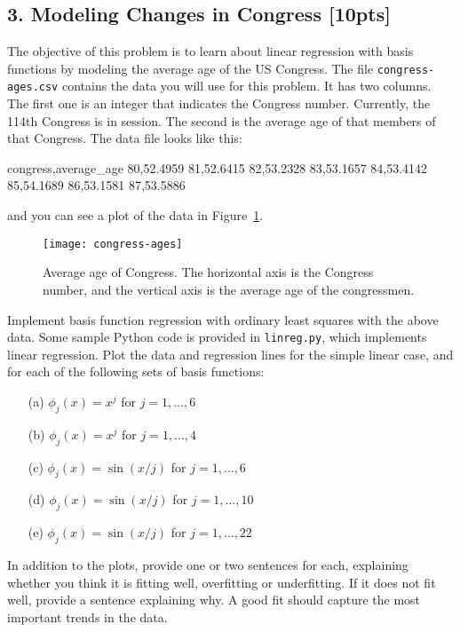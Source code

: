 \documentclass[submit]{harvardml}
\begin{document}
\newpage
\subsection*{3. Modeling Changes in Congress [10pts]}
 The objective of this problem is to learn about linear regression with basis
 functions by modeling the average age of the US Congress. The file
 \verb|congress-ages.csv| contains the data you will use for this problem.  It
 has two columns.  The first one is an integer that indicates the Congress
 number. Currently, the 114th Congress is in session. The second is the average
 age of that members of that Congress.  The data file looks like this:
\begin{csv}
congress,average_age
80,52.4959
81,52.6415
82,53.2328
83,53.1657
84,53.4142
85,54.1689
86,53.1581
87,53.5886
\end{csv}
and you can see a plot of the data in Figure~\ref{fig:congress}.

\begin{figure}[h]
\centering
\texttt{[image: congress-ages]}
\caption{Average age of Congress.  The horizontal axis is the Congress number, and the vertical axis is the average age of the congressmen.}
\label{fig:congress}
\end{figure}

\begin{problem}
Implement basis function regression with ordinary least squares with the above
data. Some sample Python code is provided in \verb|linreg.py|, which implements
linear regression.  Plot the data and regression lines for the simple linear
case, and for each of the following sets of basis functions:
\begin{itemize}
	\item[(a)] $\phi_j(x) = x^j$ for $j=1, \ldots, 6$
	\item[(b)] $\phi_j(x) = x^j$ for $j=1, \ldots, 4$
	\item[(c)] $\phi_j(x) = \sin(x / j)$ for $j=1, \ldots, 6$
	\item[(d)] $\phi_j(x) = \sin(x / j)$ for $j=1, \ldots, 10$
	\item[(e)] $\phi_j(x) = \sin(x / j)$ for $j=1, \ldots, 22$
\end{itemize}
  In addition to the plots, provide one or two sentences for each, explaining
  whether you think it is fitting well, overfitting or underfitting.  If it does
  not fit well, provide a sentence explaining why. A good fit should capture the
  most important trends in the data.
	\end{problem}
\end{document}
